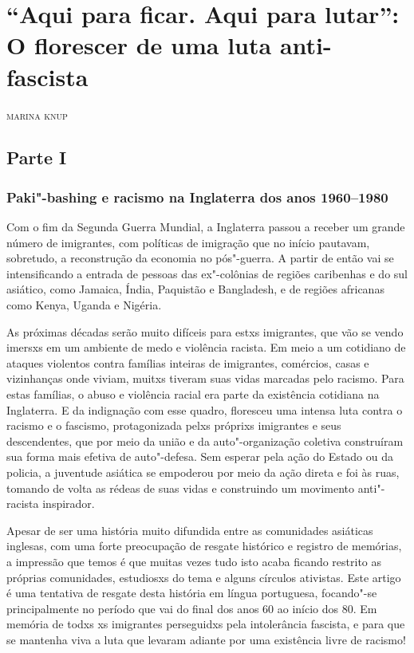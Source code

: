 \chapter{``Aqui para ficar. Aqui para lutar'': O florescer de uma luta anti-fascista}

\hfill{}\textsc{marina knup}

\bigskip

\section{Parte I}

\subsection{Paki"-bashing e racismo na Inglaterra dos anos 1960--1980}

Com o fim da Segunda Guerra Mundial, a Inglaterra passou a receber um grande número de imigrantes, com políticas de imigração que no início pautavam, sobretudo, a reconstrução da economia no pós"-guerra. A partir de então vai se intensificando a entrada de pessoas das ex"-colônias de regiões caribenhas e do sul asiático, como Jamaica, Índia, Paquistão e Bangladesh, e de regiões africanas como Kenya, Uganda e Nigéria.

As próximas décadas serão muito difíceis para estxs imigrantes, que vão se vendo imersxs em um ambiente de medo e violência racista. Em meio a um cotidiano de ataques violentos contra famílias inteiras de imigrantes, comércios, casas e vizinhanças onde viviam, muitxs tiveram suas vidas marcadas pelo racismo. Para estas famílias, o abuso e violência racial era parte da existência cotidiana na Inglaterra. E da indignação com esse quadro, floresceu uma intensa luta contra o racismo e o fascismo, protagonizada pelxs próprixs imigrantes e seus descendentes, que por meio da união e da auto"-organização coletiva construíram sua forma mais efetiva de auto"-defesa. Sem esperar pela ação do Estado ou da policia, a juventude asiática se empoderou por meio da ação direta e foi às ruas, tomando de volta as rédeas de suas vidas e construindo um movimento anti"-racista inspirador.

Apesar de ser uma história muito difundida entre as comunidades asiáticas inglesas, com uma forte preocupação de resgate histórico e registro de memórias, a impressão que temos é que muitas vezes tudo isto acaba ficando restrito as próprias comunidades, estudiosxs do tema e alguns círculos ativistas. Este artigo é uma tentativa de resgate desta história em língua portuguesa, focando"-se principalmente no período que vai do final dos anos 60 ao início dos 80. Em memória de todxs xs imigrantes perseguidxs pela intolerância fascista, e para que se mantenha viva a luta que levaram adiante por uma existência livre de racismo!


